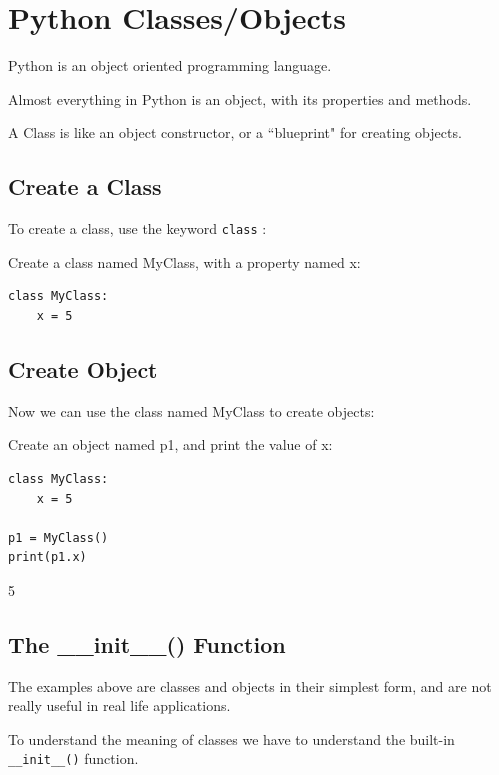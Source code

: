 \documentclass[12pt,a4paper]{article}
\newcommand{\code}[1]{%
	\colorbox{backcolour}{\lstinline{#1}}%
}
\begin{document}
\section{Python Classes/Objects}

Python is an object oriented programming language.

Almost everything in Python is an object, with its properties and methods.

A Class is like an object constructor, or a ``blueprint" for creating objects.

\subsection{Create a Class}

To create a class, use the keyword \code{class}:

\begin{ebox}
Create a class named MyClass, with a property named x:
	\begin{lstlisting}
class MyClass:
    x = 5
	\end{lstlisting}
\end{ebox}
\subsection{Create Object}

Now we can use the class named MyClass to create objects:

\begin{ebox}
Create an object named p1, and print the value of x:
	\begin{lstlisting}
class MyClass:
    x = 5

p1 = MyClass()
print(p1.x)
	\end{lstlisting}
\tcblower
	\begin{vercode}
5
	\end{vercode}
\end{ebox}
\subsection{The \_\_init\_\_() Function}

The examples above are classes and objects in their simplest form, and are not
really useful in real life applications.

To understand the meaning of classes we have to understand the built-in
\code{__init__()} function.
\end{document}
